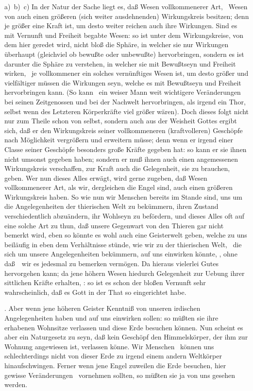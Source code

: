 \begin{aufza}
\begin{aufzb}
\item[a)\ b)\ c)]\setcounter{enumii}{3} In der Natur der Sache liegt es, daß Wesen vollkommenerer Art, \dh\ Wesen von  auch einen größeren (sich weiter ausdehnenden) Wirkungskreis besitzen; denn je größer eine Kraft ist, um desto weiter reichen auch ihre Wirkungen. Sind es mit Vernunft und Freiheit begabte Wesen: so ist unter dem Wirkungskreise, von dem hier geredet wird, nicht bloß die Sphäre, in welcher sie nur Wirkungen überhaupt (gleichviel ob bewußte oder unbewußte) hervorbringen, sondern es ist darunter die Sphäre zu verstehen, in welcher sie mit Bewußtseyn und Freiheit wirken, \dh\ je vollkommener ein solches vernünftiges Wesen ist, um desto größer und vielfältiger müssen die Wirkungen seyn, welche es mit Bewußtseyn und Freiheit hervorbringen kann. (So kann \zB\ ein weiser Mann weit wichtigere Veränderungen bei seinen Zeitgenossen und bei der Nachwelt hervorbringen, als irgend ein Thor, selbst wenn des Letzteren Körperkräfte viel größer wären). Doch dieses folgt nicht nur zum Theile schon von selbst, sondern auch aus der Weisheit Gottes ergibt sich, daß er den Wirkungskreis seiner vollkommeneren (kraftvolleren) Geschöpfe nach Möglichkeit vergrößern und erweitern müsse; denn wenn er irgend einer Classe seiner Geschöpfe besonders große Kräfte gegeben hat: so kann er sie ihnen nicht umsonst gegeben haben; sondern er muß ihnen auch einen angemessenen Wirkungskreis verschaffen, zur Kraft auch die Gelegenheit, sie zu brauchen, geben. Wer nun dieses Alles erwägt, wird gerne zugeben, daß Wesen vollkommenerer Art, als wir, dergleichen die Engel sind, auch einen größeren Wirkungskreis haben. So wie nun wir Menschen bereits im Stande sind, uns um die Angelegenheiten der thierischen Welt zu bekümmern, ihren Zustand verschiedentlich abzuändern, ihr Wohlseyn zu befördern, und dieses Alles oft auf eine solche Art zu thun, daß unsere Gegenwart von den Thieren gar nicht bemerkt wird, eben so könnte es wohl auch eine Geisterwelt geben, welche zu uns beiläufig in eben dem Verhältnisse stünde, wie wir zu der thierischen Welt, \dh\ die sich um unsere Angelegenheiten bekümmern, auf uns einwirken könnte, \usw , ohne daß~\ wir es jedesmal zu bemerken vermögen. Da hieraus vielerlei Gutes hervorgehen kann; da jene höhern Wesen hiedurch Gelegenheit zur Uebung ihrer sittlichen Kräfte erhalten, \usw : so ist es schon der bloßen Vernunft sehr wahrscheinlich, daß es Gott in der That so eingerichtet habe.\par
{}. Aber wenn jene höheren Geister Kenntniß von unseren irdischen Angelegenheiten haben und auf uns einwirken sollen: so müßten sie ihre erhabenen Wohnsitze verlassen und diese Erde besuchen können. Nun scheint es aber ein Naturgesetz zu seyn, daß kein Geschöpf den Himmelskörper, der ihm zur Wohnung angewiesen ist, verlassen könne. Wir Menschen \zB\ können uns schlechterdings nicht von dieser Erde zu irgend einem andern Weltkörper hinaufschwingen. Ferner wenn jene Engel zuweilen die Erde besuchen, hier gewisse Veränderungen \udgl\  vornehmen sollten, so müßten sie ja von uns gesehen werden.\par

\end{aufzb}
\end{aufza}
